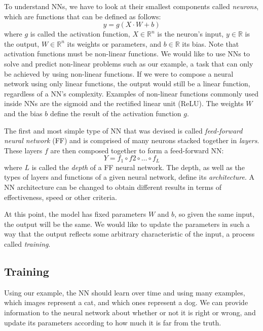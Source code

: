 To understand NNs, we have to look at their smallest components called \textit{neurons}, which are functions that can be defined as follows:
\begin{equation}
    y = g(X \cdot W + b)
\end{equation}
where $g$ is called the activation function, $X \in \mathbb{R}^n$ is the neuron's input, $y \in \mathbb{R}$ is the output, $W \in \mathbb{R}^n$ its weights or parameters, and $b \in \mathbb{R}$ its bias.
Note that activation functions must be non-linear functions.
We would like to use NNs to solve and predict non-linear problems such as our example, a task that can only be achieved by using non-linear functions.
If we were to compose a neural network using only linear functions, the output would still be a linear function, regardless of a NN's complexity.
Examples of non-linear functions commonly used inside NNs are the sigmoid and the rectified linear unit (ReLU).
The weights $W$ and the bias $b$ define the result of the activation function $g$.

The first and most simple type of NN that was devised is called \textit{feed-forward neural network} (FF) and is comprised of many neurons stacked together in \textit{layers}.
These layers $f$ are then composed together to form a feed-forward NN:
\begin{equation}
    Y = f_1 \circ f2 \circ \ldots \circ f_L
\end{equation}
where $L$ is called the \textit{depth} of a FF neural network.
The depth, as well as the types of layers and functions of a given neural network, define its \textit{architecture}.
A NN architecture can be changed to obtain different results in terms of effectiveness, speed or other criteria.

At this point, the model has fixed parameters $W$ and $b$, so given the same input, the output will be the same.
We would like to update the parameters in such a way that the output reflects some arbitrary characteristic of the input, a process called \textit{training}.

\subsection{Training}

Using our example, the NN should learn over time and using many examples, which images represent a cat, and which ones represent a dog.
We can provide information to the neural network about whether or not it is right or wrong, and update its parameters according to how much it is far from the truth.

